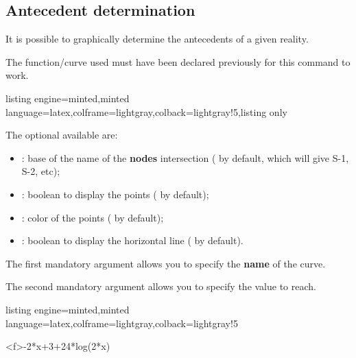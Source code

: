 \documentclass[11pt,a4paper]{ltxdoc}
\begin{document}
\pagebreak

\subsection{Antecedent determination}\label{defanteced}

It is possible to graphically determine the antecedents of a given reality.

The function/curve used must have been declared previously for this command to work.

\begin{tcblisting}{listing engine=minted,minted language=latex,colframe=lightgray,colback=lightgray!5,listing only}
\end{tcblisting}

The optional \MontreCode{[keys]} available are:

\smallskip

\begin{itemize}
	\item {}: base of the name of the \textbf{nodes} intersection ( by default, which will give \textsf{S-1}, \textsf{S-2}, etc);
	\item {}: boolean to display the points ( by default);
	\item {}: color of the points ( by default);
	\item {}: boolean to display the horizontal line ( by default).
\end{itemize}

\smallskip

The first mandatory argument allows you to specify the \textbf{name} of the curve.

\smallskip

The second mandatory argument allows you to specify the value to reach.

\begin{tcblisting}{listing engine=minted,minted language=latex,colframe=lightgray,colback=lightgray!5}
\begin{GraphTikz}%
	[x=0.9cm,y=0.425cm,Xmin=4,Xmax=20,Origx=4,
	Ymin=40,Ymax=56,Ygrid=2,Ygrids=1,Origy=40]
	{-2*x+3+24*log(2*x)}
\end{GraphTikz}
\end{tcblisting}
\end{document}
